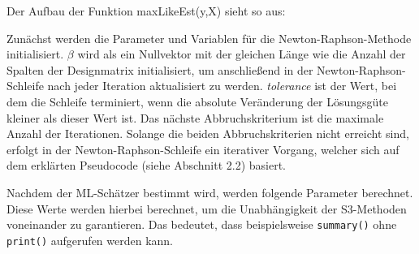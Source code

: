 \documentclass[12pt,]{article}
\newenvironment{Shaded}{\begin{snugshade}}{\end{snugshade}}
\newcommand{\StringTok}[1]{\textcolor[rgb]{0.31,0.60,0.02}{#1}}
\newcommand{\CommentTok}[1]{\textcolor[rgb]{0.56,0.35,0.01}{\textit{#1}}}
\newcommand{\ControlFlowTok}[1]{\textcolor[rgb]{0.13,0.29,0.53}{\textbf{#1}}}
\newcommand{\NormalTok}[1]{#1}
\begin{document}
Der Aufbau der Funktion maxLikeEst(y,X) sieht so aus:

\begin{Shaded}
\end{Shaded}

Zunächst werden die Parameter und Variablen für die
Newton-Raphson-Methode initialisiert. \(\beta\) wird als ein Nullvektor
mit der gleichen Länge wie die Anzahl der Spalten der Designmatrix
initialisiert, um anschließend in der Newton-Raphson-Schleife nach jeder
Iteration aktualisiert zu werden. \emph{tolerance} ist der Wert, bei dem
die Schleife terminiert, wenn die absolute Veränderung der Lösungsgüte
kleiner als dieser Wert ist. Das nächste Abbruchskriterium ist die
maximale Anzahl der Iterationen. Solange die beiden Abbruchskriterien
nicht erreicht sind, erfolgt in der Newton-Raphson-Schleife ein
iterativer Vorgang, welcher sich auf dem erklärten Pseudocode (siehe
Abschnitt 2.2) basiert.

Nachdem der ML-Schätzer bestimmt wird, werden folgende Parameter
berechnet. Diese Werte werden hierbei berechnet, um die Unabhängigkeit
der S3-Methoden voneinander zu garantieren. Das bedeutet, dass
beispielsweise \texttt{summary()} ohne \texttt{print()} aufgerufen
werden kann.
\end{document}
